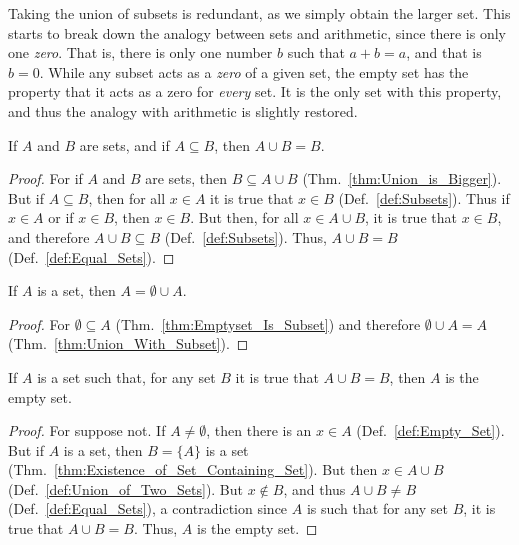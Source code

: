         Taking the union of subsets is redundant, as we simply obtain the larger
        set. This starts to break down the analogy between sets and arithmetic,
        since there is only one \textit{zero}. That is, there is only one number
        $b$ such that $a+b=a$, and that is $b=0$. While any subset acts as a
        \textit{zero} of a given set, the empty set has the property that it
        acts as a zero for \textit{every} set. It is the only set with this
        property, and thus the analogy with arithmetic is slightly restored.
        \begin{theorem}
            \label{thm:Union_With_Subset}%
            If $A$ and $B$ are sets, and if $A\subseteq{B}$, then $A\cup{B}=B$.
        \end{theorem}
        \begin{proof}
            For if $A$ and $B$ are sets, then $B\subseteq{A}\cup{B}$
            (Thm.~\ref{thm:Union_is_Bigger}). But if $A\subseteq{B}$, then for
            all $x\in{A}$ it is true that $x\in{B}$ (Def.~\ref{def:Subsets}).
            Thus if $x\in{A}$ or if $x\in{B}$, then $x\in{B}$. But then, for all
            $x\in{A}\cup{B}$, it is true that $x\in{B}$, and therefore
            $A\cup{B}\subseteq{B}$ (Def.~\ref{def:Subsets}). Thus, $A\cup{B}=B$
            (Def.~\ref{def:Equal_Sets}).
        \end{proof}
        \begin{theorem}
            \label{thm:Union_with_Emptyset}%
            If $A$ is a set, then $A=\emptyset\cup{A}$.
        \end{theorem}
        \begin{proof}
            For $\emptyset\subseteq{A}$ (Thm.~\ref{thm:Emptyset_Is_Subset}) and
            therefore $\emptyset\cup{A}=A$ (Thm.~\ref{thm:Union_With_Subset}).
        \end{proof}
        \begin{theorem}
            \label{thm:Empty_Set_Is_Zero_for_Unions}%
            If $A$ is a set such that, for any set $B$ it is true that
            $A\cup{B}=B$, then $A$ is the empty set.
        \end{theorem}
        \begin{proof}
            For suppose not. If $A\ne\emptyset$, then there is an $x\in{A}$
            (Def.~\ref{def:Empty_Set}). But if $A$ is a set, then $B=\{A\}$ is a
            set (Thm.~\ref{thm:Existence_of_Set_Containing_Set}). But then
            $x\in{A}\cup{B}$ (Def.~\ref{def:Union_of_Two_Sets}). But
            $x\notin{B}$, and thus $A\cup{B}\ne{B}$
            (Def.~\ref{def:Equal_Sets}), a contradiction
            since $A$ is such that for any set $B$, it is
            true that $A\cup{B}=B$. Thus, $A$ is the empty set.
        \end{proof}
